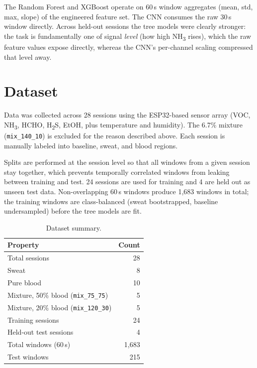 \documentclass[11pt]{article}
\begin{document}
The Random Forest and XGBoost operate on 60\,s window aggregates (mean, std, max, slope)
of the engineered feature set. The CNN consumes the raw 30\,s window directly. Across
held-out sessions the tree models were clearly stronger: the task is fundamentally one of
signal \emph{level} (how high NH\textsubscript{3} rises), which the raw feature values
expose directly, whereas the CNN's per-channel scaling compressed that level away.

\section*{Dataset}

Data was collected across 28 sessions using the ESP32-based sensor array (VOC,
NH\textsubscript{3}, HCHO, H\textsubscript{2}S, EtOH, plus temperature and humidity). The
6.7\% mixture (\texttt{mix\_140\_10}) is excluded for the reason described above. Each
session is manually labeled into baseline, sweat, and blood regions.

Splits are performed at the session level so that all windows from a given session stay
together, which prevents temporally correlated windows from leaking between training and
test. 24 sessions are used for training and 4 are held out as unseen test data.
Non-overlapping 60\,s windows produce 1{,}683 windows in total; the training windows are
class-balanced (sweat bootstrapped, baseline undersampled) before the tree models are fit.

\begin{table}[H]
\centering
\caption{Dataset summary.}
\begin{tabular}{lr}
    \toprule
    \textbf{Property} & \textbf{Count} \\
    \midrule
    Total sessions & 28 \\
    \quad Sweat & 8 \\
    \quad Pure blood & 10 \\
    \quad Mixture, 50\% blood (\texttt{mix\_75\_75}) & 5 \\
    \quad Mixture, 20\% blood (\texttt{mix\_120\_30}) & 5 \\
    \addlinespace
    Training sessions & 24 \\
    Held-out test sessions & 4 \\
    \addlinespace
    Total windows (60\,s) & 1{,}683 \\
    Test windows & 215 \\
    \bottomrule
\end{tabular}
\end{table}
\end{document}
